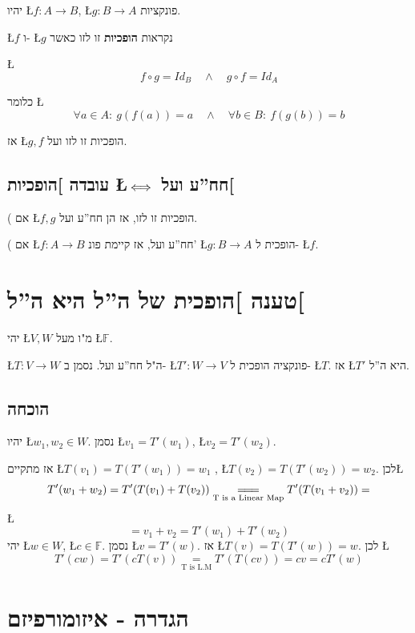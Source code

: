 \documentclass[english,hebrew]{article}
\begin{document}
יהיו \L{$f:A\to B$},\quad{} \L{$g:B\to A$} פונקציות.

\L{$f$} ו- \L{$g$} נקראות \textbf{הופכיות} זו לזו כאשר

\L{%
\[
f\circ g=Id_{B}\quad\wedge\quad g\circ f=Id_{A}
\]
}%

כלומר \L{%
\[
\forall a\in A:\ g(f(a))=a\quad\wedge\quad\forall b\in B:\ f(g(b))=b
\]
}%

אז \L{$g,f$} הופכיות זו לזו ועל.

\subsection{עובדה {]}הופכיות \L{$\protect\iff$} חח\textquotedblright ע ועל{[}}

{\endL}( אם \L{$f,g$} הופכיות זו לזו, אז הן חח\textquotedblright ע
ועל.

{\endL}( אם \L{$f:A\rightarrow B$} חח\textquotedblright ע
ועל, אז קיימת פונ' \L{$g:B\rightarrow A$} הופכית ל- \L{$f$}.

\section{טענה {]}הופכית של ה\textquotedblright ל היא ה\textquotedblright ל{[}}

יהי \L{$V,W$} מ"ו מעל \L{$\mathbb{F}$}.

\L{$T:V\to W$} ה"ל חח\textquotedblright ע ועל. נסמן ב- \L{$T':W\to V$}
פונקציה הופכית ל- \L{$T$}. אז \L{$T'$} היא ה\textquotedblright ל.

\subsection{הוכחה}

יהיו \L{$w_{1},w_{2}\in W$}. נסמן \L{$v_{1}=T'(w_{1})$}, \L{$v_{2}=T'(w_{2})$}. 

אז מתקיים \L{$T(v_{1})=T(T'(w_{1}))=w_{1}$} , \L{$T(v_{2})=T(T'(w_{2}))=w_{2}$}.
לכן\L{%
\[
T'(w_{1}+w_{2})=T'(T(v_{1})+T(v_{2}))\underset{\text{\text{T is a Linear Map}}}{=\!=\!=}T'(T(v_{1}+v_{2}))=
\]
}%
\L{%
\[
=v_{1}+v_{2}=T'(w_{1})+T'(w_{2})
\]
}%
יהי \L{$w\in W$}, \L{$c\in\mathbb{F}$}. נסמן \L{$v=T'(w)$}. אז
\L{$T(v)=T(T'(w))=w$}. לכן \L{%
\[
T'(cw)=T'(cT(v))\underset{\text{T is L.M}}{\!=\!}T'(T(cv))=cv=cT'(w)
\]
}%

\section{הגדרה - איזומורפיזם}
\end{document}
